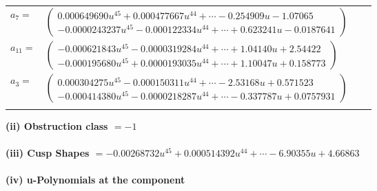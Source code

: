\documentclass[1p]{elsarticle_modified}
\theoremstyle{definition}
\begin{document}
\begin{tabular}{m{7pt} m{180pt} m{7pt} m{180pt} }
\flushright $a_{7}=$&$\begin{pmatrix}0.000649690 u^{45}+0.000477667 u^{44}+\cdots-0.254909 u-1.07065\\-0.0000243237 u^{45}-0.000122334 u^{44}+\cdots+0.623241 u-0.0187641\end{pmatrix}$ \\
\flushright $a_{11}=$&$\begin{pmatrix}-0.000621843 u^{45}-0.0000319284 u^{44}+\cdots+1.04140 u+2.54422\\-0.000195680 u^{45}+0.0000193035 u^{44}+\cdots+1.10047 u+0.158773\end{pmatrix}$ \\
\flushright $a_{3}=$&$\begin{pmatrix}0.000304275 u^{45}-0.000150311 u^{44}+\cdots-2.53168 u+0.571523\\-0.000414380 u^{45}-0.0000218287 u^{44}+\cdots-0.337787 u+0.0757931\end{pmatrix}$\\&\end{tabular}
\flushleft \textbf{(ii) Obstruction class $= -1$}\\~\\
\flushleft \textbf{(iii) Cusp Shapes $= -0.00268732 u^{45}+0.000514392 u^{44}+\cdots-6.90355 u+4.66863$}\\~\\
\newpage\renewcommand{\arraystretch}{1}
\flushleft \textbf{(iv) u-Polynomials at the component}\newline \\
\end{document}
